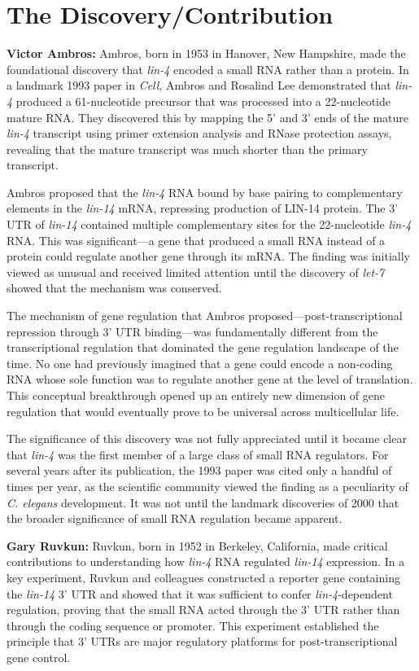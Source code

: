 \section{The Discovery/Contribution}

\textbf{Victor Ambros:} Ambros, born in 1953 in Hanover, New Hampshire, made the foundational discovery that \textit{lin-4} encoded a small RNA rather than a protein. In a landmark 1993 paper in \textit{Cell}, Ambros and Rosalind Lee demonstrated that \textit{lin-4} produced a 61-nucleotide precursor that was processed into a 22-nucleotide mature RNA. They discovered this by mapping the 5' and 3' ends of the mature \textit{lin-4} transcript using primer extension analysis and RNase protection assays, revealing that the mature transcript was much shorter than the primary transcript.

Ambros proposed that the \textit{lin-4} RNA bound by base pairing to complementary elements in the \textit{lin-14} mRNA, repressing production of LIN-14 protein. The 3' UTR of \textit{lin-14} contained multiple complementary sites for the 22-nucleotide \textit{lin-4} RNA. This was significant---a gene that produced a small RNA instead of a protein could regulate another gene through its mRNA. The finding was initially viewed as unusual and received limited attention until the discovery of \textit{let-7} showed that the mechanism was conserved.

The mechanism of gene regulation that Ambros proposed---post-transcriptional repression through 3' UTR binding---was fundamentally different from the transcriptional regulation that dominated the gene regulation landscape of the time. No one had previously imagined that a gene could encode a non-coding RNA whose sole function was to regulate another gene at the level of translation. This conceptual breakthrough opened up an entirely new dimension of gene regulation that would eventually prove to be universal across multicellular life.

The significance of this discovery was not fully appreciated until it became clear that \textit{lin-4} was the first member of a large class of small RNA regulators. For several years after its publication, the 1993 paper was cited only a handful of times per year, as the scientific community viewed the finding as a peculiarity of \textit{C. elegans} development. It was not until the landmark discoveries of 2000 that the broader significance of small RNA regulation became apparent.

\textbf{Gary Ruvkun:} Ruvkun, born in 1952 in Berkeley, California, made critical contributions to understanding how \textit{lin-4} RNA regulated \textit{lin-14} expression. In a key experiment, Ruvkun and colleagues constructed a reporter gene containing the \textit{lin-14} 3' UTR and showed that it was sufficient to confer \textit{lin-4}-dependent regulation, proving that the small RNA acted through the 3' UTR rather than through the coding sequence or promoter. This experiment established the principle that 3' UTRs are major regulatory platforms for post-transcriptional gene control.

